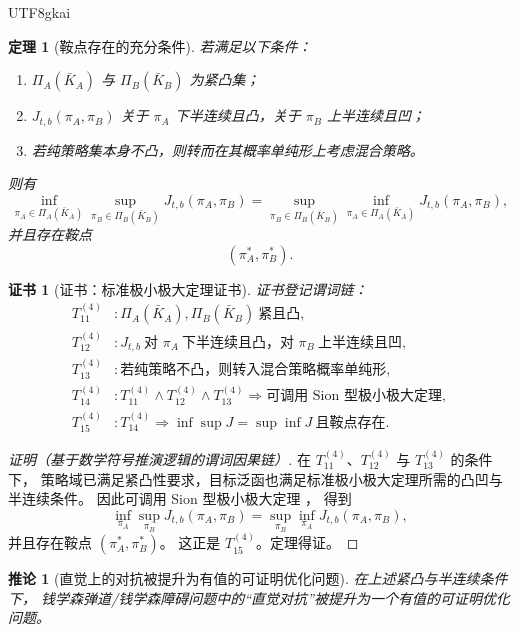 \documentclass[12pt]{article}
\newtheorem{theorem}{定理}[section]
\newtheorem{corollary}{推论}[section]
\newtheorem{Certificate}{证书}[section]
\begin{document}
\begin{CJK*}{UTF8}{gkai}
\begin{theorem}[鞍点存在的充分条件]
\label{thm:tex1-ch4-saddle}
若满足以下条件：
\begin{enumerate}
  \item \(\Pi_A(\bar K_A)\) 与 \(\Pi_B(\bar K_B)\) 为紧凸集；
  \item \(J_{t,b}(\pi_A,\pi_B)\) 关于 \(\pi_A\) 下半连续且凸，关于 \(\pi_B\) 上半连续且凹；
  \item 若纯策略集本身不凸，则转而在其概率单纯形上考虑混合策略。
\end{enumerate}
则有
\[
  \inf_{\pi_A\in\Pi_A(\bar K_A)}
  \sup_{\pi_B\in\Pi_B(\bar K_B)}
  J_{t,b}(\pi_A,\pi_B)
  =
  \sup_{\pi_B\in\Pi_B(\bar K_B)}
  \inf_{\pi_A\in\Pi_A(\bar K_A)}
  J_{t,b}(\pi_A,\pi_B),
\]
并且存在鞍点
\[
  (\pi_A^\ast,\pi_B^\ast).
\]
\end{theorem}

\begin{Certificate}[证书：标准极小极大定理证书]
\label{cert:tex1-ch4-saddle}
证书登记谓词链：
\[
\begin{aligned}
  T^{(4)}_{11} &: \Pi_A(\bar K_A),\Pi_B(\bar K_B)\ \text{紧且凸},\\
  T^{(4)}_{12} &: J_{t,b}\ \text{对 }\pi_A\ \text{下半连续且凸，对 }\pi_B\ \text{上半连续且凹},\\
  T^{(4)}_{13} &: \text{若纯策略不凸，则转入混合策略概率单纯形},\\
  T^{(4)}_{14} &: T^{(4)}_{11}\wedge T^{(4)}_{12}\wedge T^{(4)}_{13}
                  \Rightarrow \text{可调用 Sion 型极小极大定理},\\
  T^{(4)}_{15} &: T^{(4)}_{14}\Rightarrow \inf\sup J=\sup\inf J\ \text{且鞍点存在}.
\end{aligned}
\]
\end{Certificate}

\begin{proof}[证明（基于数学符号推演逻辑的谓词因果链）]
在 \(T^{(4)}_{11}\)、\(T^{(4)}_{12}\) 与 \(T^{(4)}_{13}\) 的条件下，
策略域已满足紧凸性要求，目标泛函也满足标准极小极大定理所需的凸凹与半连续条件。
因此可调用 Sion 型极小极大定理
\cite{Sion1958Minimax,Bertsekas2016NonlinearProgramming}，
得到
\[
  \inf_{\pi_A}\sup_{\pi_B}J_{t,b}(\pi_A,\pi_B)
  =
  \sup_{\pi_B}\inf_{\pi_A}J_{t,b}(\pi_A,\pi_B),
\]
并且存在鞍点 \((\pi_A^\ast,\pi_B^\ast)\)。
这正是 \(T^{(4)}_{15}\)。定理得证。
\end{proof}

\begin{corollary}[直觉上的对抗被提升为有值的可证明优化问题]
\label{cor:tex1-ch4-saddle}
在上述紧凸与半连续条件下，
钱学森弹道/钱学森障碍问题中的“直觉对抗”被提升为一个有值的可证明优化问题。
\end{corollary}


\end{CJK*}
\end{document}
